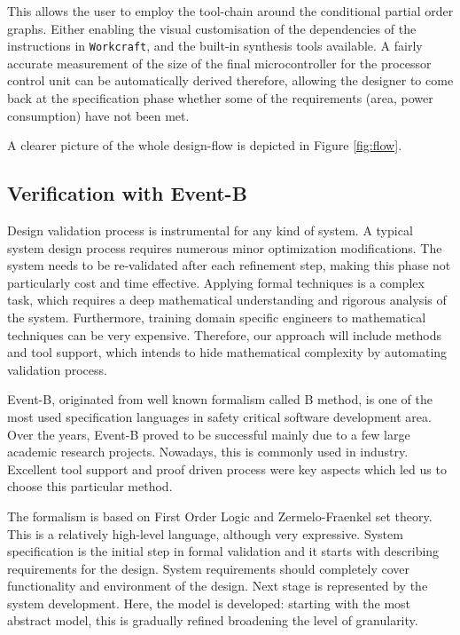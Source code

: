 \documentclass[conference]{IEEEtran}
\begin{document}
This allows the user to employ the tool-chain around the conditional partial order
graphs. Either enabling the visual customisation of the dependencies of the instructions in 
\verb|Workcraft|, and the built-in synthesis tools available. A fairly
accurate measurement of the size of the final microcontroller for the processor control
unit can be automatically derived therefore, allowing the designer to come back at the
specification phase whether some of the requirements (area, power consumption) have not been
met.

A clearer picture of the whole design-flow is depicted in Figure \ref{fig:flow}.

\subsection{Verification with Event-B}
\label{sec:ver}
Design validation process is instrumental for any kind of system. A typical system design
process requires numerous minor optimization modifications. The system needs to be 
re-validated after each refinement step, making this phase not particularly cost and time
effective. Applying formal techniques is a complex task, which requires a deep mathematical
understanding and rigorous analysis of the system. Furthermore, training domain specific
engineers to mathematical techniques can be very expensive. Therefore, our approach will
include methods and tool support, which intends to hide mathematical complexity by automating
validation process. 

Event-B, originated from well known formalism called B method, is one of the most used
specification languages in safety critical software development area. Over the years, Event-B
proved to be successful mainly due to a few large academic research projects. Nowadays, this
is commonly used in industry. Excellent tool support and proof driven process were key aspects
which led us to choose this particular method.

The formalism is based on First Order Logic and Zermelo-Fraenkel set theory. This is a
relatively high-level language, although very expressive. System specification is the initial
step in formal validation and it starts with describing requirements for the design. System
requirements should completely cover functionality and environment of the design. Next stage
is represented by the system development. Here, the model is developed: starting with the most
abstract model, this is gradually refined broadening the level of granularity.
\end{document}
